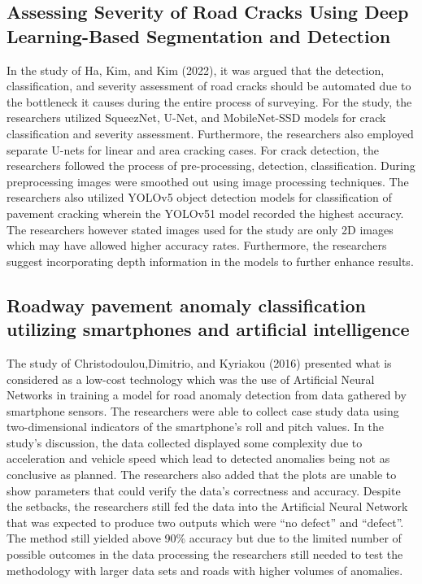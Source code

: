 \documentclass{report} %
\begin{document}
	\subsection{Assessing Severity of Road Cracks Using Deep Learning-Based Segmentation and Detection}
		In the study of Ha, Kim, and Kim (2022), it was argued that the detection, classification, and severity assessment of road cracks should be automated due to the bottleneck it causes during the entire process of surveying. For the study, the researchers utilized SqueezNet, U-Net, and MobileNet-SSD models for crack classification and severity assessment. Furthermore, the researchers also employed separate U-nets for linear and area cracking cases. For crack detection, the researchers followed the process of pre-processing, detection, classification. During preprocessing images were smoothed out using image processing techniques. The researchers also utilized YOLOv5 object detection models for classification of pavement cracking wherein the YOLOv51 model recorded the highest accuracy. The researchers however stated images used for the study are only 2D images which may have allowed higher accuracy rates. Furthermore, the researchers suggest incorporating depth information in the models to further enhance results.
	
	\subsection{Roadway pavement anomaly classification utilizing smartphones and artificial intelligence}
		The study of Christodoulou,Dimitrio, and Kyriakou (2016) presented what is considered as a low-cost technology which was the use of Artificial Neural Networks in training a model for road anomaly detection from data gathered by smartphone sensors. The researchers were able to collect case study data using two-dimensional indicators of the smartphone’s roll and pitch values. In the study’s discussion, the data collected displayed some complexity due to acceleration and vehicle speed which lead to detected anomalies being not as conclusive as planned. The researchers also added that the plots are unable to show parameters that could verify the data’s correctness and accuracy. Despite the setbacks, the researchers still fed the data into the Artificial Neural Network that was expected to produce two outputs which were “no defect” and “defect”. The method still yielded above 90\% accuracy but due to the limited number of possible outcomes in the data processing the researchers still needed to test the methodology with larger data sets and roads with higher volumes of anomalies.
		
\end{document}
